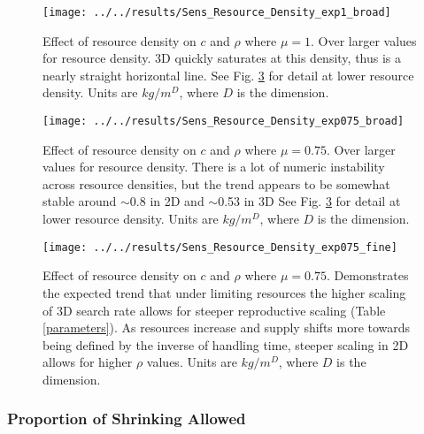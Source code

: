 \begin{figure}[h]
	\centering
	\texttt{[image: ../../results/Sens\_Resource\_Density\_exp1\_broad]}
	\caption{Effect of resource density on $c$ and $\rho$ where $\mu = 1$.  Over larger values for resource density.  3D quickly saturates at this density, thus is a nearly straight horizontal line.  See Fig. \ref{fig:sensresourcedensityexp075fine} for detail at lower resource density.  Units are $kg/m^D$, where $D$ is the dimension.}
	\label{fig:sensresourcedensityexp1broad}
\end{figure}
\begin{figure}
	\centering
	\texttt{[image: ../../results/Sens\_Resource\_Density\_exp075\_broad]}
	\caption{Effect of resource density on $c$ and $\rho$ where $\mu = 0.75$.  Over larger values for resource density.  There is a lot of numeric instability across resource densities, but the trend appears to be somewhat stable around $\sim$0.8 in 2D and $\sim$0.53 in 3D See Fig. \ref{fig:sensresourcedensityexp075fine} for detail at lower resource density.  Units are $kg/m^D$, where $D$ is the dimension.}
	\label{fig:sensresourcedensityexp075broad}
\end{figure}
\begin{figure}
	\centering
	\texttt{[image: ../../results/Sens\_Resource\_Density\_exp075\_fine]}
	\caption{Effect of resource density on $c$ and $\rho$ where $\mu = 0.75$.  Demonstrates the expected trend that under limiting resources the higher scaling of 3D search rate  allows for steeper reproductive scaling (Table \ref{parameters}).  As resources increase and supply shifts more towards being defined by the inverse of handling time, steeper scaling in 2D allows for higher $\rho$ values.  Units are $kg/m^D$, where $D$ is the dimension.}
	\label{fig:sensresourcedensityexp075fine}
\end{figure}





\subsubsection{Proportion of Shrinking Allowed}

